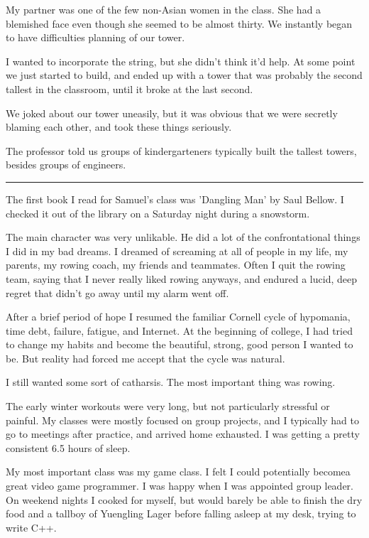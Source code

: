 My partner was one of the few non-Asian women in the class.  She had a blemished
face even though she seemed to be almost thirty.  We instantly began to have
difficulties planning of our tower.  

I wanted to incorporate the string, but she didn't think it'd help.  At some
point we just started to build, and ended up with a tower that was probably the
second tallest in the classroom, until it broke at the last second.

We joked about our tower uneasily, but it was obvious that we were secretly
blaming each other, and took these things seriously.

The professor told us groups of kindergarteners typically built the tallest
towers, besides groups of engineers. 

\plainfancybreak{12pt}{2}{* * *}

The first book I read for Samuel's class was 'Dangling Man' by Saul Bellow.  I
checked it out of the library on a Saturday night during a snowstorm.

The main character was very unlikable. He did a lot of the confrontational
things I did in my bad dreams.  I dreamed of screaming at all of people in my
life, my parents, my rowing coach, my friends and teammates.  Often I quit the
rowing team, saying that I never really liked rowing anyways, and endured a
lucid, deep regret that didn't go away until my alarm went off.

After a brief period of hope I resumed the familiar Cornell cycle of hypomania,
time debt, failure, fatigue, and Internet.  At the beginning of college, I had
tried to change my habits and become the beautiful, strong, good person I wanted
to be.  But reality had forced me accept that the cycle was natural.

I still wanted some sort of catharsis.  The most important thing was rowing.

The early winter workouts were very long, but not particularly stressful or
painful.  My classes were mostly focused on group projects, and I typically had
to go to meetings after practice, and arrived home exhausted.  I was getting a
pretty consistent 6.5 hours of sleep.

My most important class was my game class.  I felt I could potentially becomea
great video game programmer.  I was happy when I was appointed group leader.  On
weekend nights I cooked for myself, but would barely be able to finish the dry
food and a tallboy of Yuengling Lager before falling asleep at my desk, trying
to write C++.

